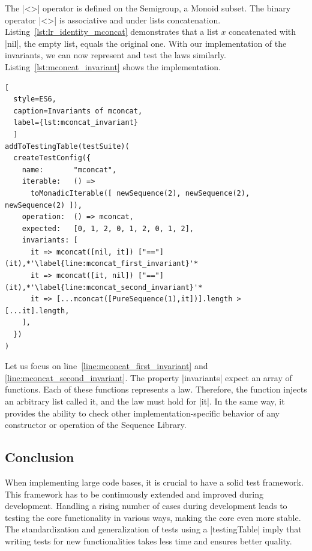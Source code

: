 The |<>| operator is defined on the Semigroup, a Monoid subset. The binary 
operator |<>| is associative and under lists concatenation. Listing~\ref{lst:lr_identity_mconcat} 
demonstrates that a list $x$ concatenated with |nil|, the empty list, equals the original 
one. With our implementation of the invariants, we can now represent and 
test the laws similarly. Listing~\ref{lst:mconcat_invariant} shows the
implementation.

\begin{lstlisting}[
  style=ES6, 
  caption=Invariants of mconcat,
  label={lst:mconcat_invariant}
  ]
addToTestingTable(testSuite)(
  createTestConfig({
    name:       "mconcat",
    iterable:   () => 
      toMonadicIterable([ newSequence(2), newSequence(2), newSequence(2) ]),
    operation:  () => mconcat,
    expected:   [0, 1, 2, 0, 1, 2, 0, 1, 2],
    invariants: [
      it => mconcat([nil, it]) ["=="] (it),*'\label{line:mconcat_first_invariant}'*
      it => mconcat([it, nil]) ["=="] (it),*'\label{line:mconcat_second_invariant}'*
      it => [...mconcat([PureSequence(1),it])].length > [...it].length,
    ],
  })
)
\end{lstlisting}

Let us focus on line~\ref{line:mconcat_first_invariant} and 
\ref{line:mconcat_second_invariant}.
The property |invariants| expect an array of functions. Each of these
functions represents a law. Therefore, the function injects an arbitrary list
called it, and the law must hold for |it|. In the same way, it provides the
ability to check other implementation-specific behavior
of any constructor or operation of the Sequence Library.

\subsection{Conclusion}
\label{sub:Conclusion}
When implementing large code bases, it is crucial to have a solid test
framework. This framework has to be continuously extended and improved during
development.
Handling a rising number of cases during development leads to testing the core
functionality in various ways, making the core even more stable.
\newline
The standardization and generalization of tests using a |testingTable| imply that
writing tests for new functionalities takes less time and ensures better
quality.
